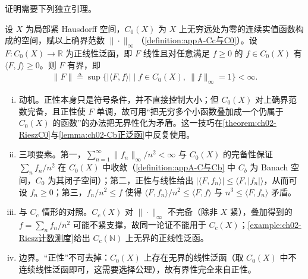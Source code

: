 \documentclass[../../main.tex]{subfiles}%
\begin{document}
证明需要下列独立引理。

\begin{lemma}\label{lemma:ch02-C0正泛函有界}
设 $X$ 为局部紧 Hausdorff 空间，$C_0(X)$ 为 $X$ 上无穷远处为零的连续实值函数构成的空间，赋以上确界范数 $\|\cdot\|_\infty$（\cref{definition:appA-Cc与C0}）。设 $F:C_0(X)\to\mathbb R$ 为正线性泛函，即 $F$ 线性且对任意满足 $f\geqslant0$ 的 $f\in C_0(X)$ 有 $\langle F,f\rangle\geqslant0$。则 $F$ 有界，即
\begin{align*}
\|F\|\triangleq\sup\{\left|\langle F,f\rangle\right|\mid f\in C_0(X),\ \|f\|_\infty=1\}<\infty.
\end{align*}
\end{lemma}

\begin{remark}\label{remark:ch02-C0有界动机}
\begin{enumerate}[(i)]
\item 动机。正性本身只是符号条件，并不直接控制大小；但 $C_0(X)$ 对上确界范数完备，且正性使 $F$ 单调，故可用“把无穷多个小函数叠加成一个仍属于 $C_0(X)$ 的函数”的办法把无界性化为矛盾。这一技巧在\cref{theorem:ch02-RieszC0}与\cref{lemma:ch02-Cb正泛函}中反复使用。
\item 三项要素。第一，$\sum_{n=1}^\infty\|f_n\|_\infty/n^2<\infty$ 与 $C_0(X)$ 的完备性保证 $\sum_nf_n/n^2$ 在 $C_0(X)$ 中收敛（\cref{definition:appA-C与Cb} 中 $C_b$ 为 Banach 空间，$C_0$ 为其闭子空间）；第二，正性与线性给出 $\left|\langle F,f_n\rangle\right|\leqslant\langle F,|f_n|\rangle$，从而可设 $f_n\geqslant0$；第三，$f_n/n^2\leqslant f$ 使得 $\langle F,f_n\rangle/n^2\leqslant\langle F,f\rangle$ 与 $n^3\leqslant\langle F,f_n\rangle$ 矛盾。
\item 与 $C_c$ 情形的对照。$C_c(X)$ 对 $\|\cdot\|_\infty$ 不完备（除非 $X$ 紧），叠加得到的 $f=\sum_nf_n/n^2$ 可能不紧支撑，故同一论证不能用于 $C_c(X)$；\cref{example:ch02-Riesz计数测度}给出 $C_c(\mathbb N)$ 上无界的正线性泛函。
\item 边界。“正性”不可去掉：$C_0(X)$ 上存在无界的线性泛函（取 $C_0(X)$ 中不连续线性泛函即可，这需要选择公理），故有界性完全来自正性。
\end{enumerate}
\end{remark}
\end{document}
